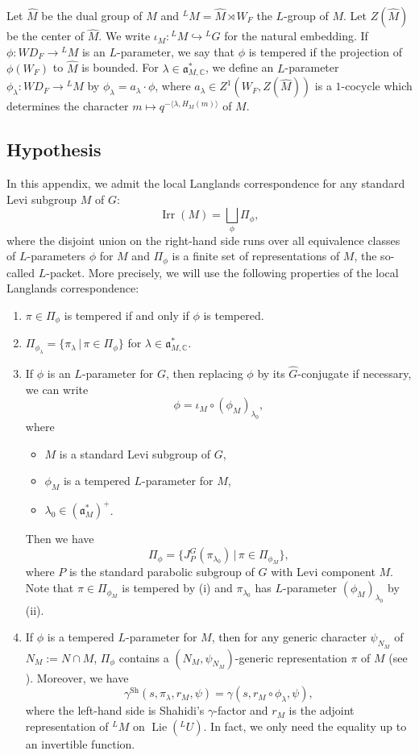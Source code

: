 \documentclass[11pt]{amsart}
\numberwithin{equation}{section}
\theoremstyle{plain}
\theoremstyle{definition}
\theoremstyle{remark}
\def\Irr{\operatorname{Irr}}
\def\Lie{\operatorname{Lie}}
\def\Sh{\mathrm{Sh}}
\def\WD{\mathit{WD}}
\def\CC{\mathbb{C}}
\def\aa{\mathfrak{a}}
\begin{document}
Let $\widehat{M}$ be the dual group of $M$ and ${}^L M = \widehat{M} \rtimes W_F$ the $L$-group of $M$.
Let $Z(\widehat{M})$ be the center of $\widehat{M}$.
We write $\iota_M : {}^L M \hookrightarrow {}^L G$ for the natural embedding.
If $\phi: \WD_F \rightarrow {}^L M$ is an $L$-parameter, we say that $\phi$ is tempered if the projection of $\phi(W_F)$ to $\widehat{M}$ is bounded.
For $\lambda \in \aa^*_{M,\CC}$, we define an $L$-parameter $\phi_\lambda : \WD_F \rightarrow {}^L M$ by $\phi_\lambda = a_\lambda \cdot \phi$, where $a_\lambda \in Z^1(W_F, Z(\widehat{M}))$ is a $1$-cocycle which determines the character $m \mapsto q^{- \langle \lambda, H_M(m) \rangle}$ of $M$.

\subsection{Hypothesis}
\label{ss:gpr-hyp}

In this appendix, we admit the local Langlands correspondence for any standard Levi subgroup $M$ of $G$:
\[
 \Irr(M) = \bigsqcup_{\phi} \Pi_{\phi},
\]
where the disjoint union on the right-hand side runs over all equivalence classes of $L$-parameters $\phi$ for $M$ and $\Pi_{\phi}$ is a finite set of representations of $M$, the so-called $L$-packet.
More precisely, we will use the following properties of the local Langlands correspondence:
\begin{enumerate}
 \item $\pi \in \Pi_\phi$ is tempered if and only if $\phi$ is tempered.
 \item $\Pi_{\phi_\lambda} = \{ \pi_\lambda \, | \, \pi \in \Pi_\phi \}$ for $\lambda \in \aa_{M,\CC}^*$.
 \item If $\phi$ is an $L$-parameter for $G$, then replacing $\phi$ by its $\widehat{G}$-conjugate if necessary, we can write 
 \[
  \phi = \iota_M \circ (\phi_M)_{\lambda_0},
 \]
 where 
 \begin{itemize}
  \item $M$ is a standard Levi subgroup of $G$, 
  \item $\phi_M$ is a tempered $L$-parameter for $M$, 
  \item $\lambda_0 \in (\aa_M^*)^+$.
 \end{itemize}
 Then we have
 \[
  \Pi_{\phi} = \{ J^G_P(\pi_{\lambda_0}) \, | \, \pi \in \Pi_{\phi_M} \},
 \]
 where $P$ is the standard parabolic subgroup of $G$ with Levi component $M$.
 Note that $\pi \in \Pi_{\phi_M}$ is tempered by (i) and $\pi_{\lambda_0}$ has $L$-parameter $(\phi_M)_{\lambda_0}$ by (ii).
 \item If $\phi$ is a tempered $L$-parameter for $M$, then for any generic character $\psi_{N_M}$ of $N_M := N \cap M$, $\Pi_\phi$ contains a $(N_M, \psi_{N_M})$-generic representation $\pi$ of $M$ (see \cite[Conjecture 9.4]{shahidi}).
 Moreover, we have
\[
 \gamma^{\Sh}(s, \pi_\lambda, r_M, \psi) = \gamma(s, r_M \circ \phi_\lambda, \psi),
\]
where the left-hand side is Shahidi's $\gamma$-factor \cite{shahidi} and $r_M$ is the adjoint representation of ${}^L M$ on $\Lie({}^L U)$.
In fact, we only need the equality up to an invertible function.
\end{enumerate}
\end{document}
